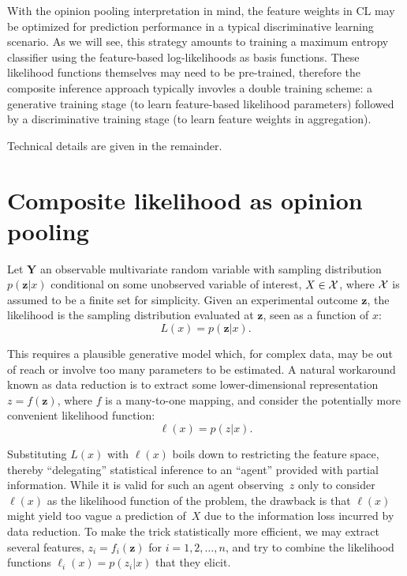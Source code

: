 \documentclass[english]{scrartcl}
\def\y{{\mathbf{y}}}
\def\y{{\mathbf{z}}}
\begin{document}
With the opinion pooling interpretation in mind, the feature weights in CL may be optimized for prediction performance in a typical discriminative learning scenario. As we will see, this strategy amounts to training a maximum entropy classifier using the feature-based log-likelihoods as basis functions. These likelihood functions themselves may need to be pre-trained, therefore the composite inference approach typically invovles a double training scheme: a generative training stage (to learn feature-based likelihood parameters) followed by a discriminative training stage (to learn feature weights in aggregation).

Technical details are given in the remainder.



\section{Composite likelihood as opinion pooling}
\label{sec:log_pool}

Let $\mathbf{Y}$ an observable multivariate random variable with sampling distribution $p(\y|x)$ conditional on some unobserved variable of interest, $X\in{\cal X}$, where ${\cal X}$ is assumed to be a finite set for simplicity. Given an experimental outcome $\y$, the likelihood is the sampling distribution evaluated at $\y$, seen as a function of $x$:
$$
L(x) = p(\y|x)
.
$$

This requires a plausible generative model which, for complex data, may be out of reach or involve too many parameters to be estimated. A natural workaround known as data reduction is to extract some lower-dimensional representation $z=f(\y)$, where $f$ is a many-to-one mapping, and consider the potentially more convenient likelihood function:
$$
\ell(x) = p(z|x)
.
$$

Substituting $L(x)$ with $\ell(x)$ boils down to restricting the feature space, thereby  ``delegating'' statistical inference to an ``agent'' provided with partial information. While it is valid for such an agent observing~$z$ only to consider $\ell(x)$ as the likelihood function of the problem, the drawback is that $\ell(x)$ might yield too vague a prediction of~$X$ due to the information loss incurred by data reduction. To make the trick statistically more efficient, we may extract several features, $z_i=f_i(\y)$ for $i=1,2,\ldots,n$, and try to combine the likelihood functions $\ell_i(x) = p(z_i|x)$ that they elicit.
\end{document}
